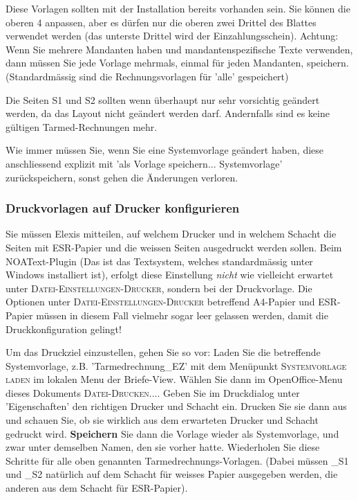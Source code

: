 \documentclass[a4paper]{scrartcl}
\begin{document}
\medskip

Diese Vorlagen sollten mit der Installation bereits vorhanden sein. Sie können die oberen 4 anpassen, aber es dürfen nur die oberen zwei Drittel des Blattes verwendet werden (das unterste Drittel wird der Einzahlungsschein). Achtung: Wenn Sie mehrere Mandanten haben und mandantenspezifische Texte verwenden, dann müssen Sie jede Vorlage mehrmals, einmal für jeden Mandanten, speichern. (Standardmässig sind die Rechnungsvorlagen für 'alle' gespeichert)

Die Seiten S1 und S2 sollten wenn überhaupt nur sehr vorsichtig geändert werden, da das Layout nicht geändert werden darf. Andernfalls sind es keine gültigen Tarmed-Rechnungen mehr.

Wie immer müssen Sie, wenn Sie eine Systemvorlage geändert haben, diese anschliessend explizit mit 'als Vorlage speichern... Systemvorlage' zurückspeichern, sonst gehen die Änderungen verloren.

\subsubsection{Druckvorlagen auf Drucker konfigurieren}
\label{druckkonfiguration}
Sie müssen Elexis mitteilen, auf welchem Drucker und in welchem Schacht die Seiten mit ESR-Papier und die weissen Seiten ausgedruckt werden sollen. Beim NOAText-Plugin (Das ist das Textsystem, welches standardmässig unter Windows installiert ist), erfolgt diese Einstellung \textit{nicht} wie vielleicht erwartet unter \textsc{Datei-Einstellungen-Drucker}, sondern bei der Druckvorlage. Die Optionen unter \textsc{Datei-Einstellungen-Drucker} betreffend A4-Papier und ESR-Papier müssen in diesem Fall vielmehr sogar leer gelassen werden, damit die Druckkonfiguration gelingt!

\medskip

Um das Druckziel einzustellen, gehen Sie so vor: Laden Sie die betreffende Systemvorlage, z.B. 'Tarmedrechnung\_EZ' mit dem Menüpunkt \textsc{Systemvorlage laden} im lokalen Menu der Briefe-View. Wählen Sie dann im OpenOffice-Menu dieses Dokuments \textsc{Datei-Drucken...}. Geben Sie im Druckdialog unter 'Eigenschaften' den richtigen Drucker und Schacht ein.  Drucken Sie sie dann aus und schauen Sie, ob sie wirklich aus dem erwarteten Drucker und Schacht gedruckt wird. \textbf{Speichern} Sie dann die Vorlage wieder als Systemvorlage, und zwar unter demselben Namen, den sie vorher hatte. Wiederholen Sie diese Schritte für alle oben genannten Tarmedrechnungs-Vorlagen. (Dabei müssen \_S1 und \_S2 natürlich auf dem Schacht für weisses Papier ausgegeben werden, die anderen aus dem Schacht für ESR-Papier).
\end{document}

